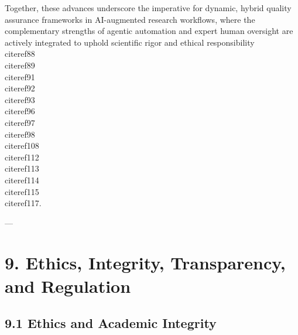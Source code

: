 \documentclass[11pt]{article}
\begin{document}
Together, these advances underscore the imperative for dynamic, hybrid quality assurance frameworks in AI-augmented research workflows, where the complementary strengths of agentic automation and expert human oversight are actively integrated to uphold scientific rigor and ethical responsibility \\cite{ref88}\\cite{ref89}\\cite{ref91}\\cite{ref92}\\cite{ref93}\\cite{ref96}\\cite{ref97}\\cite{ref98}\\cite{ref108}\\cite{ref112}\\cite{ref113}\\cite{ref114}\\cite{ref115}\\cite{ref117}.

---
\section{9. Ethics, Integrity, Transparency, and Regulation}

\subsection{9.1 Ethics and Academic Integrity}
\end{document}
